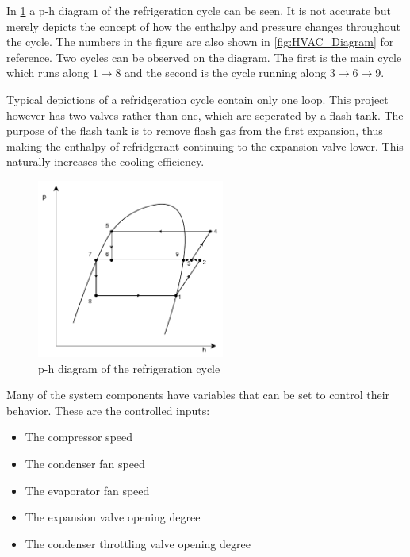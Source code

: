 In \cref{fig:p-h_diagram} a p-h diagram of the refrigeration cycle can be seen. It is not accurate but merely depicts the concept of how the enthalpy and pressure changes throughout the cycle. The numbers in the figure are also shown in \cref{fig:HVAC_Diagram} for reference. Two cycles can be observed on the diagram. The first is the main cycle which runs along $1 \rightarrow 8$ and the second is the cycle running along $3\rightarrow 6 \rightarrow 9$. 

Typical depictions of a refridgeration cycle contain only one loop. This project however has two valves rather than one, which are seperated by a flash tank. The purpose of the flash tank is to remove flash gas from the first expansion, thus making the enthalpy of refridgerant continuing to the expansion valve lower. This naturally increases the cooling efficiency.\\

\begin{figure}[h!]
	\centering
	\includegraphics[width=0.55\textwidth]{Graphics/Flash_Tank_P-h_Diagram}
	\caption{p-h diagram of the refrigeration cycle}
	\label{fig:p-h_diagram}
\end{figure}


Many of the system components have variables that can be set to control their behavior. These are the controlled inputs:

\begin{itemize}
	\item The compressor speed
	\item The condenser fan speed
	\item The evaporator fan speed
	\item The expansion valve opening degree
	\item The condenser throttling valve opening degree
\end{itemize}

